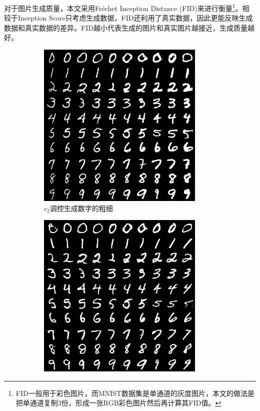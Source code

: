 对于图片生成质量，本文采用Fréchet Inception Distance (FID)\citep{heusel2017gans}来进行衡量\footnote{FID一般用于彩色图片，而MNIST数据集是单通道的灰度图片，本文的做法是把单通道复制3份，形成一张RGB彩色图片然后再计算其FID值。}。相较于Inception Score\citep{salimans2016improved}只考虑生成数据，FID还利用了真实数据，因此更能反映生成数据和真实数据的差异。FID越小代表生成的图片和真实图片越接近，生成质量越好。

\begin{figure}[htb]
  \centering
  \begin{subfigure}[b]{\trif\textwidth}
    \includegraphics[width=\textwidth]{Img/icg-width.png}
    \caption{$c_2$调控生成数字的粗细}
    \label{ffig:m-icg-witdth}
  \end{subfigure} 
  \begin{subfigure}[b]{\trif\textwidth}
    \includegraphics[width=\textwidth]{Img/icg-rotation.png}

\end{subfigure}
\end{figure}
